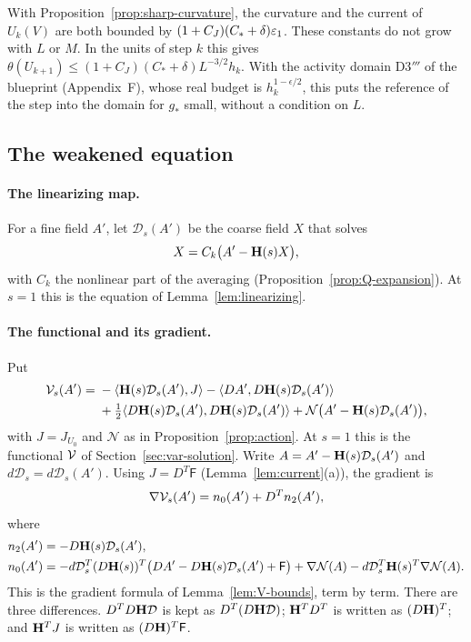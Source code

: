 With Proposition~\ref{prop:sharp-curvature}, the curvature and the current of $U_k(V)$ are both bounded by $(1+C_J)(C_*+\delta)\varepsilon_1$. These constants do not grow with $L$ or $M$. In the units of step $k$ this gives $\theta(U_{k+1})\le(1+C_J)(C_*+\delta)L^{-3/2}h_k$. With the activity domain D3$'''$ of the blueprint (Appendix~F), whose real budget is $h_k^{1-\epsilon/2}$, this puts the reference of the step into the domain for $g_*$ small, without a condition on $L$.

\subsection{The weakened equation}

\paragraph{The linearizing map.} For a fine field $A'$, let $\mathcal D_s(A')$ be the coarse field $X$ that solves
\begin{equation}\label{eq:Ds}
X=C_k\big(A'-\mathbf H(s)X\big),
\end{equation}
with $C_k$ the nonlinear part of the averaging (Proposition~\ref{prop:Q-expansion}). At $s=1$ this is the equation of Lemma~\ref{lem:linearizing}.

\paragraph{The functional and its gradient.} Put
\[
\begin{aligned}
\mathcal V_s(A')={}&-\langle \mathbf H(s)\mathcal D_s(A'),J\rangle-\langle DA',D\mathbf H(s)\mathcal D_s(A')\rangle\\
&+\tfrac12\langle D\mathbf H(s)\mathcal D_s(A'),D\mathbf H(s)\mathcal D_s(A')\rangle+\mathcal N\big(A'-\mathbf H(s)\mathcal D_s(A')\big),
\end{aligned}
\]
with $J=J_{U_0}$ and $\mathcal N$ as in Proposition~\ref{prop:action}. At $s=1$ this is the functional $\mathcal V$ of Section~\ref{sec:var-solution}. Write $A=A'-\mathbf H(s)\mathcal D_s(A')$ and $d\mathcal D_s=d\mathcal D_s(A')$. Using $J=D^T\mathsf F$ (Lemma~\ref{lem:current}(a)), the gradient is
\begin{equation}\label{eq:gradV-s}
\nabla\mathcal V_s(A')=n_0(A')+D^Tn_2(A'),
\end{equation}
where
\[
\begin{aligned}
n_2(A')&=-D\mathbf H(s)\mathcal D_s(A'),\\
n_0(A')&=-d\mathcal D_s^T(D\mathbf H(s))^T\big(DA'-D\mathbf H(s)\mathcal D_s(A')+\mathsf F\big)+\nabla\mathcal N(A)-d\mathcal D_s^T\mathbf H(s)^T\nabla\mathcal N(A).
\end{aligned}
\]
This is the gradient formula of Lemma~\ref{lem:V-bounds}, term by term. There are three differences. $D^TD\mathbf H\mathcal D$ is kept as $D^T(D\mathbf H\mathcal D)$; $\mathbf H^TD^T$ is written as $(D\mathbf H)^T$; and $\mathbf H^TJ$ is written as $(D\mathbf H)^T\mathsf F$.

